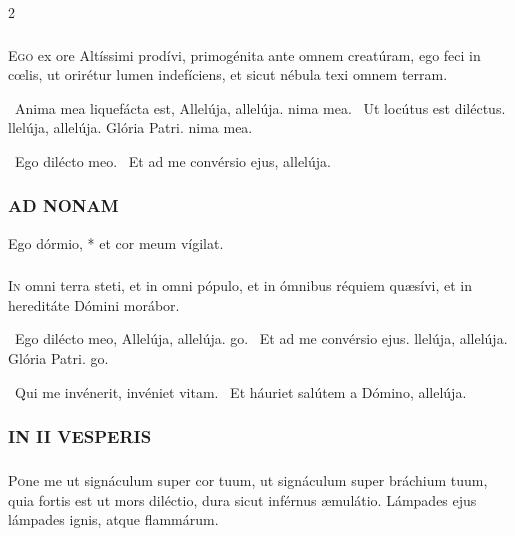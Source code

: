 \documentclass[9pt,twoside]{extarticle}
\begin{document}
\begin{multicols}{2}
\smallskip
\subsubsection*{\normalfont {}}
\lettrine{E}{go} ex ore Altíssimi prodívi, primogénita ante omnem creatúram, ego feci in cœlis, ut orirétur lumen indefíciens, et sicut nébula texi omnem terram.

\item {}~Anima mea liquefácta est, \textred{*} Allelúja, allelúja. nima mea.
~Ut locútus est diléctus. llelúja, allelúja.
Glória Patri. nima mea.

~Ego dilécto meo. ~Et ad me convérsio ejus, allelúja.

\subsubsection*{\center \normalfont \textsc{AD NONAM}}
 Ego dórmio, * et cor meum vígilat.

\smallskip
\subsubsection*{\normalfont {}}
\lettrine{I}{n} omni terra steti, et in omni pópulo, et in ómnibus réquiem quæsívi, et in hereditáte Dómini morábor.

~Ego dilécto meo, \textred{*} Allelúja, allelúja. go.
~Et ad me convérsio ejus. llelúja, allelúja.
Glória Patri. go.

~Qui me invénerit, invéniet vitam. ~Et háuriet salútem a Dómino, allelúja.

\subsubsection*{\center \normalfont \textsc{IN II VESPERIS}}
{\small {}}

\subsubsection*{\normalfont {}}
\lettrine{P}{o}ne me ut signáculum super cor tuum, ut signáculum super bráchium tuum, quia fortis est ut mors diléctio, dura sicut inférnus æmulátio. Lámpades ejus lámpades ignis, atque flammárum.


\end{multicols}
\end{document}
